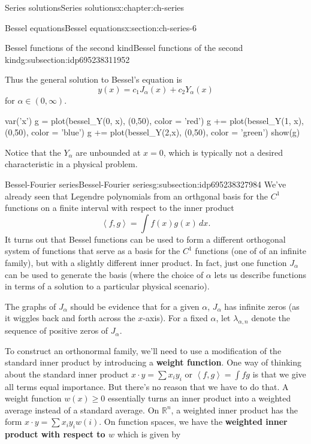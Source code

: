 \documentclass[oneside,10pt,]{book}
\newcommand{\terminology}[1]{\textbf{#1}}
\numberwithin{equation}{section}
\newcommand{\R}{\mathbb{R}}
\newcommand{\ip}[2]{\left\langle #1, #2 \right\rangle}
\newcommand\la{\lambda}
\numberwithin{equation}{section}
\begin{document}
\begin{chapterptx}{Series solutions}{}{Series solutions}{}{}{x:chapter:ch-series}
\begin{sectionptx}{Bessel equations}{}{Bessel equations}{}{}{x:section:ch-series-6}
\begin{subsectionptx}{Bessel functions of the second kind}{}{Bessel functions of the second kind}{}{}{g:subsection:idp695238311952}
\par
Thus the general solution to Bessel's equation is%
\begin{equation*}
y(x) = c_1 J_\alpha(x) + c_2 Y_\alpha(x)
\end{equation*}
for \(\alpha \in (0,\infty)\).%
\begin{sageinput}
var('x')
g = plot(bessel_Y(0, x), (0,50), color = 'red')
g += plot(bessel_Y(1, x), (0,50), color = 'blue')
g += plot(bessel_Y(2,x), (0,50), color = 'green')
show(g)
\end{sageinput}
Notice that the \(Y_\alpha\) are unbounded at \(x = 0\), which is typically not a desired characteristic in a physical problem.%
\end{subsectionptx}
%
%
\typeout{************************************************}
\typeout{************************************************}
%
\begin{subsectionptx}{Bessel-Fourier series}{}{Bessel-Fourier series}{}{}{g:subsection:idp695238327984}
We've already seen that Legendre polynomials from an orthgonal basis for the \(C^1\) functions on a finite interval with respect to the inner product%
\begin{equation*}
\ip{f}{g} = \int f(x) g(x) \, dx.
\end{equation*}
It turns out that Bessel functions can be used to form a different orthogonal system of functions that serve as a basis for the \(C^1\) functions (one of of an infinite family), but with a slightly different inner product. In fact, just one function \(J_\alpha\) can be used to generate the basis (where the choice of \(\alpha\) lets us describe functions in terms of a solution to a particular physical scenario).%
\par
The graphs of \(J_\alpha\) should be evidence that for a given \(\alpha\), \(J_\alpha\) has infinite zeros (as it wiggles back and forth across the \(x\)-axis). For a fixed \(\alpha\), let \(\la_{\alpha, n}\) denote the sequence of positive zeros of \(J_\alpha\).%
\par
To construct an orthonormal family, we'll need to use a modification of the standard inner product by introducing a \terminology{weight function}. One way of thinking about the standard inner product \(x \cdot y = \sum x_i y_i\) or \(\ip{f}{g} = \int fg\) is that we give all terms equal importance. But there's no reason that we have to do that. A weight function \(w(x) \geq 0\) essentially turns an inner product into a weighted average instead of a standard average. On \(\R^n\), a weighted inner product has the form \(x \cdot y = \sum x_i y_i w(i)\). On function spaces, we have the \terminology{weighted inner product with respect to \(w\)} which is given by%

\end{subsectionptx}
\end{sectionptx}
\end{chapterptx}
\end{document}
